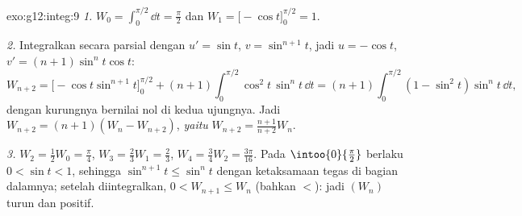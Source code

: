 \begin{solution}{exo:g12:integ:9}
\emph{1.} $W_0 = \int_0^{\pi/2} \dd t = \frac{\pi}{2}$ dan
$W_1 = \bigl[-\cos t\bigr]_0^{\pi/2} = 1$.

\emph{2.} Integralkan secara parsial dengan $u' = \sin t$, $v = \sin^{n+1} t$,
jadi $u = -\cos t$, $v' = (n+1)\sin^n t \cos t$:
\[
W_{n+2} = \bigl[-\cos t \sin^{n+1} t\bigr]_0^{\pi/2}
+ (n+1)\int_0^{\pi/2} \cos^2 t\,\sin^n t\,\dd t
= (n+1)\int_0^{\pi/2} (1 - \sin^2 t)\sin^n t\,\dd t,
\]
dengan kurungnya bernilai nol di kedua ujungnya. Jadi
$W_{n+2} = (n+1)(W_n - W_{n+2})$, \emph{yaitu}
$W_{n+2} = \frac{n+1}{n+2} W_n$.

\emph{3.} $W_2 = \frac12 W_0 = \frac{\pi}{4}$,
$W_3 = \frac23 W_1 = \frac23$,
$W_4 = \frac34 W_2 = \frac{3\pi}{16}$.
Pada $\intoo{0}{\frac\pi2}$ berlaku $0 < \sin t < 1$, sehingga
$\sin^{n+1} t \leq \sin^n t$ dengan ketaksamaan tegas di bagian dalamnya;
setelah diintegralkan, $0 < W_{n+1} \leq W_n$ (bahkan $<$): jadi $(W_n)$ turun
dan positif.
\end{solution}

